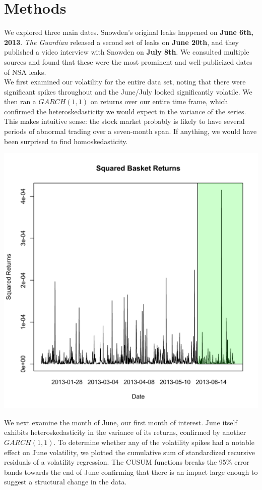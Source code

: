 \documentclass[11pt]{amsart}
\begin{document}
\section{Methods}
We explored three main dates. Snowden's original leaks happened on \textbf{June 6th, 2013}. \textit{The Guardian} released a second set of leaks on \textbf{June 20th}, and they published a video interview with Snowden on \textbf{July 8th}. We consulted multiple sources and found that these were the most prominent and well-publicized dates of NSA leaks.  \\

We first examined our volatility for the entire data set, noting that there were significant spikes throughout and the June/July looked significantly volatile. We then ran a $GARCH(1,1)$ on returns over our entire time frame, which confirmed the heteroskedasticity we would expect in the variance of the series. This makes intuitive sense: the stock market probably is likely to have several periods of abnormal trading over a seven-month span. If anything, we would have been surprised to find homoskedasticity. \\

\centerline{\includegraphics[scale=0.5]{basket_sq_returns_12_08.pdf}}

We next examine the month of June, our first month of interest. June itself exhibits heteroskedasticity in the variance of its returns, confirmed by another $GARCH(1,1)$.  To determine whether any of the volatility spikes had a notable effect on June volatility, we plotted the cumulative sum of standardized recursive residuals of a volatility regression. The CUSUM functions breaks the 95\% error bands towards the end of June confirming that there is an impact large enough to suggest a structural change in the data.\\
\end{document}
